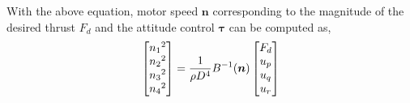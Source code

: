 With the above equation, motor speed \({\boldsymbol n} \) corresponding to the magnitude of the desired thrust \(F_d\) and the attitude control \({\boldsymbol \tau}\) can be computed as, \\
\begin{equation}
\label{eq:n_u}
\begin{aligned}
\begin{bmatrix}
{n_1}^2 \\
{n_2}^2 \\
{n_3}^2 \\
{n_4}^2
\end{bmatrix}
= {1 \over \rho D^4 }B^{-1} ({\boldsymbol n})
\begin{bmatrix}
F_d\\
u_p\\
u_q\\
u_r
\end{bmatrix}
\end{aligned}
\end{equation}


